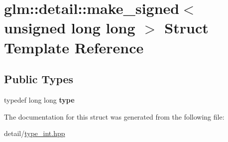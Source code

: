 \hypertarget{structglm_1_1detail_1_1make__signed_3_01unsigned_01long_01long_01_4}{\section{glm\-:\-:detail\-:\-:make\-\_\-signed$<$ unsigned long long $>$ Struct Template Reference}
\label{structglm_1_1detail_1_1make__signed_3_01unsigned_01long_01long_01_4}
}
\subsection*{Public Types}
\begin{DoxyCompactItemize}
\item 
\hypertarget{structglm_1_1detail_1_1make__signed_3_01unsigned_01long_01long_01_4_a025f1f9880bc973147ffb0371771eb0b}{typedef long long {\bfseries type}}\label{structglm_1_1detail_1_1make__signed_3_01unsigned_01long_01long_01_4_a025f1f9880bc973147ffb0371771eb0b}

\end{DoxyCompactItemize}


The documentation for this struct was generated from the following file\-:\begin{DoxyCompactItemize}
\item 
detail/\hyperlink{type__int_8hpp}{type\-\_\-int.\-hpp}\end{DoxyCompactItemize}
